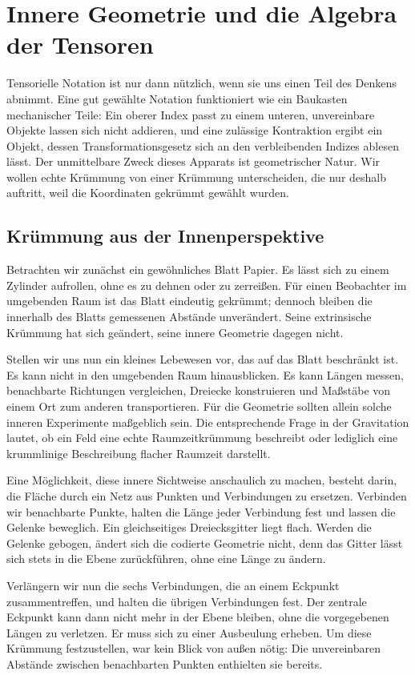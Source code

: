 \chapter{Innere Geometrie und die Algebra der Tensoren}

Tensorielle Notation ist nur dann nützlich, wenn sie uns einen Teil des Denkens abnimmt.
Eine gut gewählte Notation funktioniert wie ein Baukasten mechanischer Teile: Ein oberer Index passt zu einem unteren, unvereinbare Objekte lassen sich nicht addieren, und eine zulässige Kontraktion ergibt ein Objekt, dessen Transformationsgesetz sich an den verbleibenden Indizes ablesen lässt. Der unmittelbare Zweck dieses Apparats ist geometrischer Natur. Wir wollen echte Krümmung von einer Krümmung unterscheiden, die nur deshalb auftritt, weil die Koordinaten gekrümmt gewählt wurden.

\section{Krümmung aus der Innenperspektive}

Betrachten wir zunächst ein gewöhnliches Blatt Papier. Es lässt sich zu einem Zylinder aufrollen, ohne es zu dehnen oder zu zerreißen. Für einen Beobachter im umgebenden Raum ist das Blatt eindeutig gekrümmt; dennoch bleiben die innerhalb des Blatts gemessenen Abstände unverändert. Seine extrinsische Krümmung hat sich geändert, seine innere Geometrie dagegen nicht.

Stellen wir uns nun ein kleines Lebewesen vor, das auf das Blatt beschränkt ist. Es kann nicht in den umgebenden Raum hinausblicken. Es kann Längen messen, benachbarte Richtungen vergleichen, Dreiecke konstruieren und Maßstäbe von einem Ort zum anderen transportieren.
Für die Geometrie sollten allein solche inneren Experimente maßgeblich sein. Die entsprechende Frage in der Gravitation lautet, ob ein Feld eine echte Raumzeitkrümmung beschreibt oder lediglich eine krummlinige Beschreibung flacher Raumzeit darstellt.

Eine Möglichkeit, diese innere Sichtweise anschaulich zu machen, besteht darin, die Fläche durch ein Netz aus Punkten und Verbindungen zu ersetzen. Verbinden wir benachbarte Punkte, halten die Länge jeder Verbindung fest und lassen die Gelenke beweglich. Ein gleichseitiges Dreiecksgitter liegt flach. Werden die Gelenke gebogen, ändert sich die codierte Geometrie nicht, denn das Gitter lässt sich stets in die Ebene zurückführen, ohne eine Länge zu ändern.

Verlängern wir nun die sechs Verbindungen, die an einem Eckpunkt zusammentreffen, und halten die übrigen Verbindungen fest. Der zentrale Eckpunkt kann dann nicht mehr in der Ebene bleiben, ohne die vorgegebenen Längen zu verletzen. Er muss sich zu einer Ausbeulung erheben. Um diese Krümmung festzustellen, war kein Blick von außen nötig: Die unvereinbaren Abstände zwischen benachbarten Punkten enthielten sie bereits.


